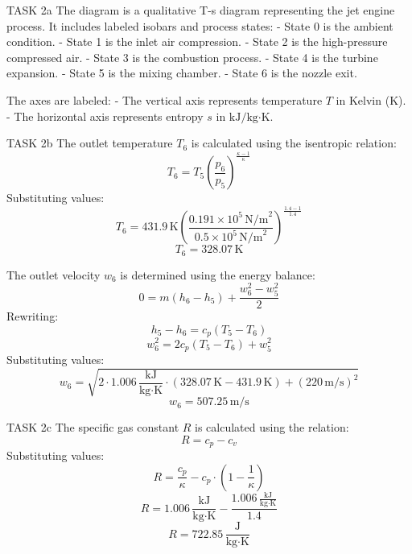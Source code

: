 TASK 2a  
The diagram is a qualitative T-s diagram representing the jet engine process. It includes labeled isobars and process states:  
- State 0 is the ambient condition.  
- State 1 is the inlet air compression.  
- State 2 is the high-pressure compressed air.  
- State 3 is the combustion process.  
- State 4 is the turbine expansion.  
- State 5 is the mixing chamber.  
- State 6 is the nozzle exit.  

The axes are labeled:  
- The vertical axis represents temperature \( T \) in Kelvin (\( \text{K} \)).  
- The horizontal axis represents entropy \( s \) in \( \text{kJ/kg·K} \).  

TASK 2b  
The outlet temperature \( T_6 \) is calculated using the isentropic relation:  
\[
T_6 = T_5 \left( \frac{p_6}{p_5} \right)^{\frac{\kappa-1}{\kappa}}
\]  
Substituting values:  
\[
T_6 = 431.9 \, \text{K} \left( \frac{0.191 \times 10^5 \, \text{N/m}^2}{0.5 \times 10^5 \, \text{N/m}^2} \right)^{\frac{1.4-1}{1.4}}
\]  
\[
T_6 = 328.07 \, \text{K}
\]  

The outlet velocity \( w_6 \) is determined using the energy balance:  
\[
0 = m \left( h_6 - h_5 \right) + \frac{w_6^2 - w_5^2}{2}
\]  
Rewriting:  
\[
h_5 - h_6 = c_p \left( T_5 - T_6 \right)
\]  
\[
w_6^2 = 2 c_p \left( T_5 - T_6 \right) + w_5^2
\]  
Substituting values:  
\[
w_6 = \sqrt{2 \cdot 1.006 \, \frac{\text{kJ}}{\text{kg·K}} \cdot (328.07 \, \text{K} - 431.9 \, \text{K}) + (220 \, \text{m/s})^2}
\]  
\[
w_6 = 507.25 \, \text{m/s}
\]  

TASK 2c  
The specific gas constant \( R \) is calculated using the relation:  
\[
R = c_p - c_v
\]  
Substituting values:  
\[
R = \frac{c_p}{\kappa} - c_p \cdot \left( 1 - \frac{1}{\kappa} \right)
\]  
\[
R = 1.006 \, \frac{\text{kJ}}{\text{kg·K}} - \frac{1.006 \, \frac{\text{kJ}}{\text{kg·K}}}{1.4}
\]  
\[
R = 722.85 \, \frac{\text{J}}{\text{kg·K}}
\]